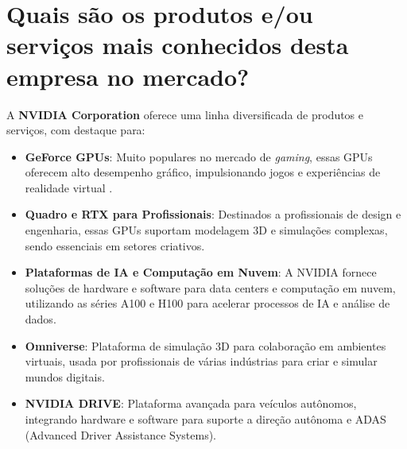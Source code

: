 \section{Quais são os produtos e/ou serviços mais conhecidos desta empresa no mercado?}

A \textbf{NVIDIA Corporation} oferece uma linha diversificada de produtos e serviços, com destaque para:

\begin{itemize}
    \item \textbf{GeForce GPUs}: Muito populares no mercado de \textit{gaming}, essas GPUs oferecem alto desempenho gráfico, impulsionando jogos e experiências de realidade virtual \cite{nvidia_main_products}.
    
    \item \textbf{Quadro e RTX para Profissionais}: Destinados a profissionais de design e engenharia, essas GPUs suportam modelagem 3D e simulações complexas, sendo essenciais em setores criativos.
    
    \item \textbf{Plataformas de IA e Computação em Nuvem}: A NVIDIA fornece soluções de hardware e software para data centers e computação em nuvem, utilizando as séries A100 e H100 para acelerar processos de IA e análise de dados.
    
    \item \textbf{Omniverse}: Plataforma de simulação 3D para colaboração em ambientes virtuais, usada por profissionais de várias indústrias para criar e simular mundos digitais.
    
    \item \textbf{NVIDIA DRIVE}: Plataforma avançada para veículos autônomos, integrando hardware e software para suporte a direção autônoma e ADAS (Advanced Driver Assistance Systems).
\end{itemize}

